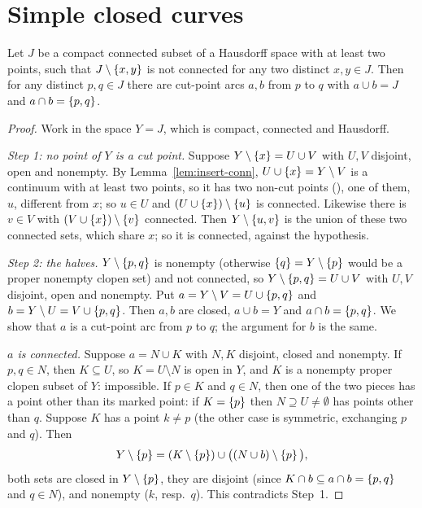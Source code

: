 \section{Simple closed curves}

\begin{theorem}\label{thm:circle-char}
Let $J$ be a compact connected subset of a Hausdorff space with at least two points, such that
$J\setminus\left\{ x,y \right\}$ is not connected for any two distinct $x,y\in J$. Then for any distinct
$p,q\in J$ there are cut-point arcs $a,b$ from $p$ to $q$ with $a\cup b=J$ and $a\cap b=\left\{ p,q \right\}$.
\end{theorem}

\begin{proof}
Work in the space $Y=J$, which is compact, connected and Hausdorff.

\emph{Step 1: no point of $Y$ is a cut point.} Suppose $Y\setminus\left\{ x \right\}=U\cup V$ with $U,V$
disjoint, open and nonempty. By Lemma~\ref{lem:insert-conn}, $U\cup\left\{ x \right\}=Y\setminus V$ is a
continuum with at least two points, so it has two non-cut points (), one of
them, $u$, different from $x$; so $u\in U$ and $(U\cup\left\{ x \right\})\setminus\left\{ u \right\}$ is connected.
Likewise there is $v\in V$ with $(V\cup\left\{ x \right\})\setminus\left\{ v \right\}$ connected. Then
$Y\setminus\left\{ u,v \right\}$ is the union of these two connected sets, which share $x$; so it is
connected, against the hypothesis.

\emph{Step 2: the halves.} $Y\setminus\left\{ p,q \right\}$ is nonempty (otherwise $\left\{ q \right\}=Y\setminus\left\{ p \right\}$
would be a proper nonempty clopen set) and not connected, so $Y\setminus\left\{ p,q \right\}=U\cup V$ with
$U,V$ disjoint, open and nonempty. Put $a=Y\setminus V=U\cup\left\{ p,q \right\}$ and $b=Y\setminus
U=V\cup\left\{ p,q \right\}$. Then $a,b$ are closed, $a\cup b=Y$ and $a\cap b=\left\{ p,q \right\}$. We show that $a$ is
a cut-point arc from $p$ to $q$; the argument for $b$ is the same.

\emph{$a$ is connected.} Suppose $a=N\cup K$ with $N,K$ disjoint, closed and nonempty. If $p,q\in
N$, then $K\subseteq U$, so $K=U\setminus N$ is open in $Y$, and $K$ is a nonempty proper clopen
subset of $Y$: impossible. If $p\in K$ and $q\in N$, then one of the two pieces has a point other
than its marked point: if $K=\left\{ p \right\}$ then $N\supseteq U\ne\emptyset$ has points other than $q$.
Suppose $K$ has a point $k\ne p$ (the other case is symmetric, exchanging $p$ and $q$). Then
\[
Y\setminus\left\{ p \right\}=(K\setminus\left\{ p \right\})\cup\big((N\cup b)\setminus\left\{ p \right\}\big),
\]
both sets are closed in $Y\setminus\left\{ p \right\}$, they are disjoint (since $K\cap b\subseteq a\cap
b=\left\{ p,q \right\}$ and $q\in N$), and nonempty ($k$, resp.\ $q$). This contradicts Step~1.


\end{proof}
